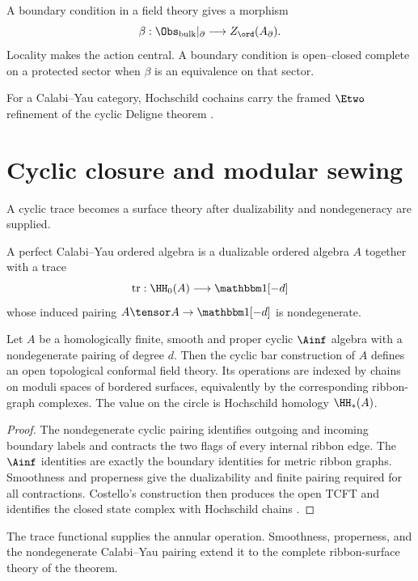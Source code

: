 A boundary condition in a field theory gives a morphism
\[
 \beta:\Obs_{\mathrm{bulk}}|_{\partial}\longrightarrow Z_{\ord}(A_{\partial}).
\]
Locality makes the action central. A boundary condition is open--closed complete on a protected sector when $\beta$ is an equivalence on that sector.

For a Calabi--Yau category, Hochschild cochains carry the framed $\Etwo$ refinement of the cyclic Deligne theorem \cite{BravRozenblyum}.

\chapter{Cyclic closure and modular sewing}
A cyclic trace becomes a surface theory after dualizability and nondegeneracy are supplied.

\begin{definition}
A perfect Calabi--Yau ordered algebra is a dualizable ordered algebra $A$ together with a trace
\[
 \operatorname{tr}:\HH_0(A)\longrightarrow\mathbbm1[-d]
\]
whose induced pairing $A\tensor A\to\mathbbm1[-d]$ is nondegenerate.
\end{definition}

\begin{theorem}
Let $A$ be a homologically finite, smooth and proper cyclic $\Ainf$ algebra with a nondegenerate pairing of degree $d$.  Then the cyclic bar construction of $A$ defines an open topological conformal field theory.  Its operations are indexed by chains on moduli spaces of bordered surfaces, equivalently by the corresponding ribbon-graph complexes.  The value on the circle is Hochschild homology $\HH_*(A)$.
\end{theorem}
\begin{proof}
The nondegenerate cyclic pairing identifies outgoing and incoming boundary labels and contracts the two flags of every internal ribbon edge.  The $\Ainf$ identities are exactly the boundary identities for metric ribbon graphs.  Smoothness and properness give the dualizability and finite pairing required for all contractions.  Costello's construction then produces the open TCFT and identifies the closed state complex with Hochschild chains \cite{CostelloCY}.
\end{proof}

\begin{remark}
The trace functional supplies the annular operation.  Smoothness, properness, and the nondegenerate Calabi--Yau pairing extend it to the complete ribbon-surface theory of the theorem.
\end{remark}

